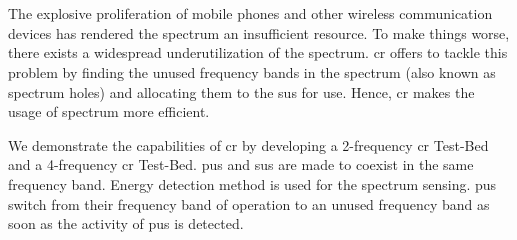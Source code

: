 \chapter*{}


The explosive proliferation of mobile phones and other wireless communication
devices has rendered the spectrum an insufficient resource. To make things
worse, there exists a widespread underutilization of the spectrum. \gls{cr}
offers to tackle this problem by finding the unused frequency bands
in the spectrum (also known as spectrum holes) and allocating them to the
\glspl{su} for use. Hence, \gls{cr} makes the usage of spectrum more
efficient.

We demonstrate the capabilities of \gls{cr} by developing a 2-frequency \gls{cr} Test-Bed
and a 4-frequency \gls{cr} Test-Bed. \glspl{pu} and \glspl{su} are made to
coexist in the same frequency band. Energy detection method is used for the
spectrum sensing. \glspl{pu} switch from their frequency band of operation to an
unused frequency band as soon as the activity of \glspl{pu} is detected.